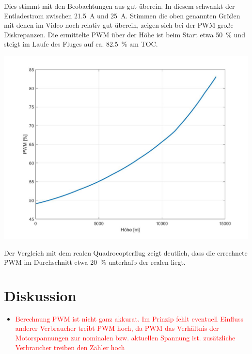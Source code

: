 Dies stimmt mit den Beobachtungen aus \cite{Anderson.2018} gut überein. In diesem schwankt der Entladestrom zwischen \SI{21,5}{A} und \SI{25}{A}.
Stimmen die oben genannten Größen mit denen im Video noch relativ gut überein, zeigen sich bei der PWM große Diskrepanzen. Die ermittelte PWM über der Höhe ist beim Start etwa \SI{50}{\%} und steigt im Laufe des Fluges auf ca. \SI{82,5}{\%} am TOC. 
\begin{center}
	\includegraphics[scale=0.3]{Diagramme/PWM.jpg}
	\label{pic:pwm_russland}
\end{center}
Der Vergleich mit dem realen Quadrocopterflug zeigt deutlich, dass die errechnete PWM im Durchschnitt etwa \SI{20}{\%} unterhalb der realen liegt.


\section{Diskussion}
\label{sec:nachbildung_diskussion}

\begin{itemize}
	\item \textcolor{red}{Berechnung PWM ist nicht ganz akkurat. Im Prinzip fehlt eventuell Einfluss anderer Verbraucher treibt PWM hoch, da PWM das Verhältnis der Motorspannungen zur nominalen bzw. aktuellen Spannung ist. zusätzliche Verbraucher treiben den Zähler hoch }
\end{itemize}

